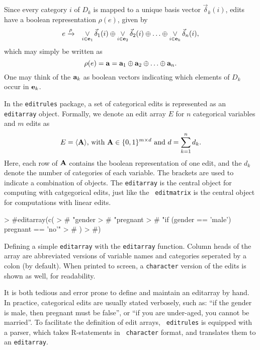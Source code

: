 \documentclass[11pt, fleqn, a4paper]{article}
\DeclareMathOperator*{\Lor}{\lor}
\begin{document}
Since every category $i$ of $D_k$ is mapped to a unique basis vector
$\vec{\delta}_k(i)$,  edits have a boolean representation $\rho(e)$, given by
\begin{eqnarray}
    e &\xrightarrow{\rho}&
    \Lor_{i\in{\bf e}_1}\vec{\delta}_1(i)\oplus
    \Lor_{i\in{\bf e}_2}\vec{\delta}_2(i)\oplus\ldots
    \oplus\Lor_{i\in{\bf e}_k}\vec{\delta}_n(i),
\end{eqnarray}
which may simply be written as
\begin{equation}
    \rho(e) ={\bf a} = {\bf a}_1\oplus{\bf a}_2\oplus\ldots\oplus{\bf a}_n.
\label{EqRhoE}
\end{equation}
One may think of the ${\bf a}_k$ as boolean vectors indicating which elements of $D_k$
occur in ${\bf e}_k$.

In the {\tt editrules} package, a set of categorical edits is represented as an {\tt editarray}
object. Formally, we denote an edit array $E$ for $n$ categorical variables and $m$ edits as
\begin{equation}
    E = \langle {\bf A}\rangle\textrm{, with }{\bf A}\in\{0,1\}^{m\times d}\textrm{ and }
    d = \sum_{k=1}^n d_k.
    \label{eqEditarray}
\end{equation}
Here, each row of ${\bf A}$ contains the boolean representation of one edit,
and the $d_k$ denote the number of categories of each variable. The brackets
are used to indicate a combination of objects. The {\tt editarray} is the
central object for computing with catgegorical edits, just like the {\tt
editmatrix} is the central object for computations with linear edits.
 
%
\begin{Rcode}
\begin{Schunk}
\begin{Sinput}
> #editarray(c(
> #    "gender %in% c('male','female')",
> #    "pregnant %in% c('yes','no')",
> #    "if (gender == 'male') pregnant == 'no'"
> #    )
> #)
\end{Sinput}
\end{Schunk}
\caption{Defining a simple {\tt editarray} with the {\tt editarray} function. 
Column heads of the array are abbreviated versions of variable names and categories
seperated by a colon (by default). When printed to screen, a {\tt character} version
of the edits is shown as well, for readability.
}
\label{Reditarray}
\end{Rcode}
%

It is both tedious and error prone to define and maintain an editarray by hand.
In practice, categorical edits are usually stated verbosely, such as: ``if the
gender is male, then pregnant must be false'', or ``if you are under-aged, you
cannot be married''. To facilitate the definition of edit arrays, {\tt
editrules} is equipped with a parser, which takes R-statements in {\tt
character} format, and translates them to an {\tt editarray}.
\end{document}
